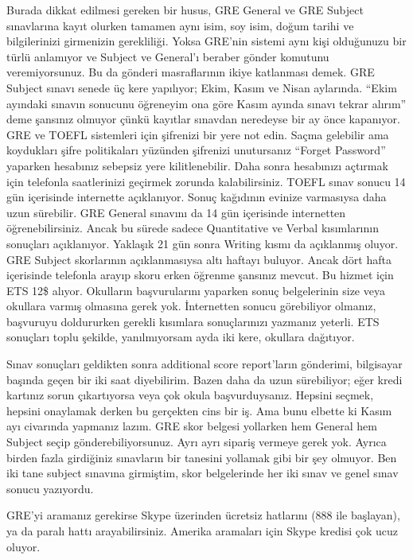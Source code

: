 \documentclass[12pt]{article}
\begin{document}
Burada dikkat edilmesi gereken bir husus, GRE General ve GRE Subject sınavlarına kayıt olurken tamamen aynı isim, soy isim, doğum tarihi ve bilgilerinizi girmenizin gerekliliği. Yoksa GRE’nin sistemi aynı kişi olduğunuzu bir türlü anlamıyor ve Subject ve General’ı beraber gönder komutunu veremiyorsunuz. Bu da gönderi masraflarının ikiye katlanması demek. GRE Subject sınavı senede üç kere yapılıyor; Ekim, Kasım ve Nisan aylarında. ``Ekim ayındaki sınavın sonucunu öğreneyim ona göre Kasım ayında sınavı tekrar alırım'' deme şansınız olmuyor çünkü kayıtlar sınavdan neredeyse bir ay önce kapanıyor. GRE ve TOEFL sistemleri için şifrenizi bir yere not edin. Saçma gelebilir ama koydukları şifre politikaları yüzünden şifrenizi unutursanız “Forget Password” yaparken hesabınız sebepsiz yere kilitlenebilir. Daha sonra hesabınızı açtırmak için telefonla saatlerinizi geçirmek zorunda kalabilirsiniz. TOEFL sınav sonucu 14 gün içerisinde internette açıklanıyor. Sonuç kağıdının evinize varmasıysa daha uzun sürebilir. GRE General sınavını da 14 gün içerisinde internetten öğrenebilirsiniz. Ancak bu sürede sadece Quantitative ve Verbal kısımlarının sonuçları açıklanıyor. Yaklaşık 21 gün sonra Writing kısmı da açıklanmış oluyor. GRE Subject skorlarının açıklanmasıysa altı haftayı buluyor. Ancak dört hafta içerisinde telefonla arayıp skoru erken öğrenme şansınız mevcut. Bu hizmet için ETS 12\$ alıyor. Okulların başvurularını yaparken sonuç belgelerinin size veya okullara varmış olmasına gerek yok. İnternetten sonucu görebiliyor olmanız, başvuruyu doldururken gerekli kısımlara sonuçlarınızı yazmanız yeterli. ETS sonuçları toplu şekilde, yanılmıyorsam ayda iki kere, okullara dağıtıyor.

Sınav sonuçları geldikten sonra additional score report’ların gönderimi, bilgisayar başında geçen bir iki saat diyebilirim. Bazen daha da uzun sürebiliyor; eğer kredi kartınız sorun çıkartıyorsa veya çok okula başvurduysanız. Hepsini seçmek, hepsini onaylamak derken bu gerçekten cins bir iş. Ama bunu elbette ki Kasım ayı civarında yapmanız lazım. GRE skor belgesi yollarken hem General hem Subject seçip gönderebiliyorsunuz. Ayrı ayrı sipariş vermeye gerek yok. Ayrıca birden fazla girdiğiniz sınavların bir tanesini yollamak gibi bir şey olmuyor. Ben iki tane subject sınavına girmiştim, skor belgelerinde her iki sınav ve genel sınav sonucu yazıyordu.

GRE’yi aramanız gerekirse Skype üzerinden ücretsiz hatlarını (888 ile başlayan), ya da paralı hattı arayabilirsiniz. Amerika aramaları için Skype kredisi çok ucuz oluyor.
 
\end{document}
